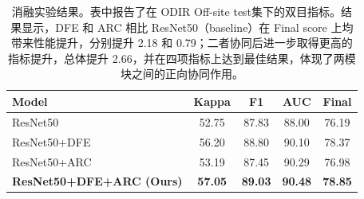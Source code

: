 \begin{table}[!htb]
\centering
\caption{消融实验结果。表中报告了在 ODIR Off-site test集下的双目指标。结果显示，DFE 和 ARC 相比 ResNet50（baseline）在 Final score 上均带来性能提升，分别提升 2.18 和 0.79；二者协同后进一步取得更高的指标提升，总体提升 2.66，并在四项指标上达到最佳结果，体现了两模块之间的正向协同作用。}
\label{tab:ablation}
\begin{tabular}{lcccc}
\toprule
Model & Kappa & F1 & AUC & Final \\
\midrule
ResNet50 & 52.75 & 87.83 & 88.00 & 76.19 \\
ResNet50+DFE & 56.20 & 88.80 & 90.10 & 78.37 \\
ResNet50+ARC & 53.19 & 87.45 & 90.29 & 76.98 \\
\textbf{ResNet50+DFE+ARC (Ours)} & \textbf{57.05} & \textbf{89.03} & \textbf{90.48} & \textbf{78.85} \\
\bottomrule
\end{tabular}
\end{table}
